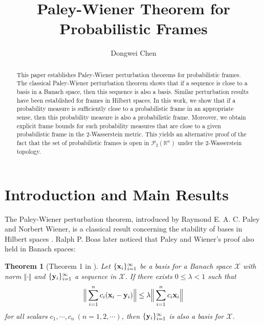\documentclass{amsart}
\numberwithin{equation}{section}
\theoremstyle{plain}
\newtheorem{theorem}{Theorem}[section]
\theoremstyle{definition}
\begin{document}

\title[Paley-Wiener Theorem for Probabilistic Frames]{Paley-Wiener Theorem for Probabilistic Frames}

\author{Dongwei Chen}

\begin{abstract}
This paper establishes Paley-Wiener perturbation theorems for probabilistic frames.
The classical Paley-Wiener perturbation theorem shows that if a sequence is close to a basis in a Banach space, then this sequence is also a basis.  Similar perturbation results have been established for frames in Hilbert spaces. In this work, we show that if a probability measure is sufficiently close to a probabilistic frame in an appropriate sense, then this probability measure is also a probabilistic frame. Moreover, we obtain explicit frame bounds for such probability measures that are close to a given probabilistic frame in the $2$-Wasserstein metric. This yields an alternative proof of the fact that the set of probabilistic frames is open in $\mathcal{P}_2(\mathbb{R}^n)$ under the $2$-Wasserstein topology.
\end{abstract}


\address{Department of Mathematics, Colorado State University, Fort Collins, CO, USA, 80523.}
\maketitle


\section{Introduction and Main Results}

The Paley-Wiener perturbation theorem, introduced by Raymond E. A. C. Paley and Norbert Wiener, is a classical result concerning the stability of bases in Hilbert spaces \cite{paley1934fourier}. 
Ralph P. Boas later noticed that Paley and Wiener's proof also held in Banach spaces:

\begin{theorem}[Theorem 1 in \cite{boas1940general}] \label{PaleyBasis}
    Let $\{{\bf x}_i\}_{i=1}^\infty$ be a basis for a Banach space $\mathcal{X}$ with norm $ \Vert \cdot \Vert $ and $\{{\bf y}_i\}_{i=1}^\infty$ a sequence in $\mathcal{X}$. If there exists $0 \leq \lambda <1$  such that 
    \begin{equation*}
     \Big   \Vert \sum_{i=1}^n c_i ({\bf x}_i-{\bf y}_i)  \Big \Vert \leq \lambda  \Big \Vert \sum_{i=1}^n c_i {\bf x}_i \Big \Vert
    \end{equation*}
for all scalars $c_1, \cdots, c_n \ (n =1, 2, \cdots)$,  then $\{{\bf y}_i\}_{i=1}^\infty$ is also a basis for $\mathcal{X}$. 
\end{theorem}
\end{document}
